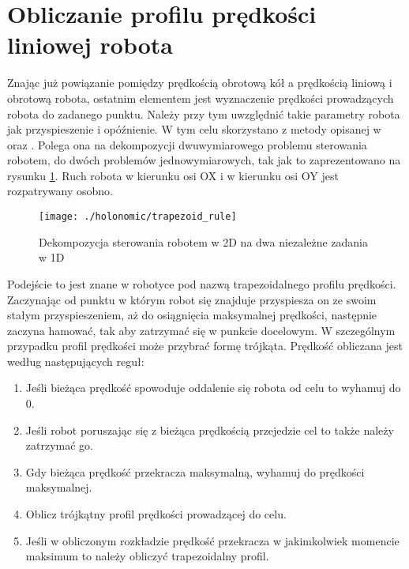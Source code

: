 \section{Obliczanie profilu prędkości liniowej robota \label{sec:trapezoid_vel}}
Znając już powiązanie pomiędzy prędkością obrotową kół a prędkością liniową i obrotową robota, ostatnim elementem jest wyznaczenie prędkości prowadzących 
robota do zadanego punktu. Należy przy tym uwzględnić takie parametry robota jak przyspieszenie i opóźnienie. W tym celu skorzystano z metody opisanej w 
\cite{trapezy1} oraz \cite{trapezy2}. Polega ona na dekompozycji dwuwymiarowego problemu sterowania robotem, do dwóch problemów jednowymiarowych, tak jak to zaprezentowano
na rysunku \ref{fig:trapezoid_rule}. Ruch robota w kierunku osi OX i w kierunku osi OY jest rozpatrywany osobno. 
\begin{figure}[H]
\centering
\texttt{[image: ./holonomic/trapezoid\_rule]}
\caption{ Dekompozycja sterowania robotem w 2D na dwa niezależne zadania w 1D }\label{fig:trapezoid_rule}
\end{figure}
Podejście to jest znane w robotyce pod nazwą trapezoidalnego profilu prędkości.
Zaczynając od punktu w którym robot się znajduje przyspiesza on
ze swoim stałym przyspieszeniem, aż do osiągnięcia maksymalnej prędkości, następnie zaczyna hamować, tak aby zatrzymać się w punkcie docelowym.
W szczególnym przypadku profil prędkości może przybrać formę trójkąta.
Prędkość obliczana jest według następujących reguł:
\begin{enumerate}
\item Jeśli bieżąca prędkość spowoduje oddalenie się robota od celu to wyhamuj do 0.
\item Jeśli robot poruszając się z bieżąca prędkością przejedzie cel to także należy zatrzymać go.
\item Gdy bieżąca prędkość przekracza maksymalną, wyhamuj do prędkości maksymalnej.
\item Oblicz trójkątny profil prędkości prowadzącej do celu.
\item Jeśli w obliczonym rozkładzie prędkość przekracza w jakimkolwiek momencie maksimum to należy obliczyć trapezoidalny profil. 
\end{enumerate} 

